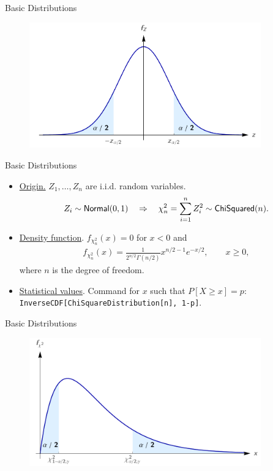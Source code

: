 \begin{frame}{Basic Distributions}

\begin{figure}[htbp]
	\centering
	\includegraphics[width=10cm]{./images/rc4fig3.png}
\end{figure}

\end{frame}


\begin{frame}{Basic Distributions}

\begin{itemize}
	\item \underline{Origin.} $Z_1, \ldots, Z_n$ are i.i.d. random variables.
	\begin{align*}
	Z_i\sim \mathsf{Normal}(0, 1) \quad \Rightarrow\quad \chi_n^2 = \sum_{i=1}^n Z_i^2 \sim \mathsf{ChiSquared}(n).
	\end{align*}
	\item \underline{Density function}. $f_{\chi_n^2}(x) = 0$ for $x < 0$ and
	\begin{align*}
	f_{\chi_n^2}(x) = \frac{1}{2^{n/2}\Gamma(n/2)} x^{n/2-1} e^{-x/2}, \qquad x \geq 0,
	\end{align*}
	where $n$ is the degree of freedom.
	\item \underline{Statistical values}. Command for $x$ such that $P[X\geq x] = p$:\\
	\texttt{InverseCDF[ChiSquareDistribution[n], 1-p]}.
\end{itemize}

\end{frame}


\begin{frame}{Basic Distributions}

\begin{figure}[htbp]
	\centering
	\includegraphics[width=10cm]{./images/rc4fig4.png}
\end{figure}

\end{frame}


